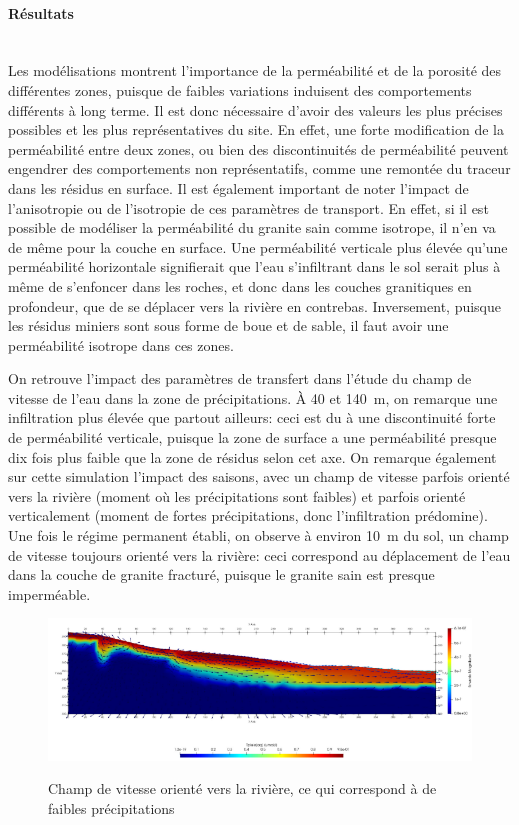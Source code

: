 \documentclass{article}
\begin{document}
\paragraph{Résultats \\ \\}
Les modélisations montrent l’importance de la perméabilité et de la porosité des différentes zones, puisque de faibles variations induisent des comportements différents à long terme. Il est donc nécessaire d’avoir des valeurs les plus précises possibles et les plus représentatives du site. En effet, une forte modification de la perméabilité entre deux zones, ou bien des discontinuités de perméabilité peuvent engendrer des comportements non représentatifs, comme une remontée du traceur dans les résidus en surface. Il est également important de noter l'impact de l'anisotropie ou de l'isotropie de ces paramètres de transport. En effet, si il est possible de modéliser la perméabilité du granite sain comme isotrope, il n'en va de même pour la couche en surface. Une perméabilité verticale plus élevée qu'une perméabilité horizontale signifierait que l'eau s'infiltrant dans le sol serait plus à même de s'enfoncer dans les roches, et donc dans les couches granitiques en profondeur, que de se déplacer vers la rivière en contrebas. Inversement, puisque les résidus miniers sont sous forme de boue et de sable, il faut avoir une perméabilité isotrope dans ces zones.

On retrouve l'impact des paramètres de transfert dans l'étude du champ de vitesse de l'eau dans la zone de précipitations. À 40 et 140~m, on remarque une infiltration plus élevée que partout ailleurs: ceci est du à une discontinuité forte de perméabilité verticale, puisque la zone de surface a une perméabilité presque dix fois plus faible que la zone de résidus selon cet axe. On remarque également sur cette simulation l'impact des saisons, avec un champ de vitesse parfois orienté vers la rivière (moment où les précipitations sont faibles) et parfois orienté verticalement (moment de fortes précipitations, donc l'infiltration prédomine). Une fois le régime permanent établi, on observe à environ 10~m du sol, un champ de vitesse toujours orienté vers la rivière: ceci correspond au déplacement de l'eau dans la couche de granite fracturé, puisque le granite sain est presque imperméable.

\begin{figure}[H]
    \centering
    \includegraphics[width=0.9\linewidth]{III_B_3_6.png}
    \label{fig:v_précipitations_ribiere_1}
    \caption{Champ de vitesse orienté vers la rivière, ce qui correspond à de faibles précipitations}
\end{figure}
\end{document}
